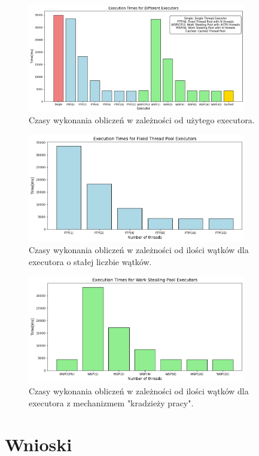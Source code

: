 \documentclass[11pt]{article}
\begin{document}
\begin{figure}[H]
\centering
\includegraphics[width=0.85\textwidth]{./exec.png}
\caption{Czasy wykonania obliczeń w zależności od użytego executora.}
\end{figure}


\begin{figure}[H]
\centering
\includegraphics[width=0.85\textwidth]{./fixed.png}
\caption{Czasy wykonania obliczeń w zależności od ilości wątków dla executora o stałej liczbie wątków.}
\end{figure}


\begin{figure}[H]
\centering
\includegraphics[width=0.85\textwidth]{./steal.png}
\caption{Czasy wykonania obliczeń w zależności od ilości wątków dla executora z mechanizmem "kradzieży pracy".}
\end{figure}
\section*{Wnioski}
\label{sec:org65c3935}
\end{document}

